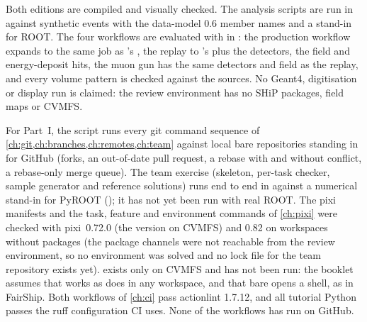 Both editions are compiled and visually checked. The analysis scripts are
run in  against synthetic events with
the data-model 0.6 member names and a stand-in for ROOT. The four workflows
are evaluated with  in : the
production workflow expands to the same job as 's
, the replay to 's
 plus the detectors, the field and
energy-deposit hits, the muon gun has the same detectors and field as the
replay, and every volume pattern is checked against the
 sources. No Geant4, digitisation or display run is claimed:
the review environment has no SHiP packages, field maps or CVMFS.

For Part~I, the script  runs every git
command sequence of \cref{ch:git,ch:branches,ch:remotes,ch:team} against local bare repositories standing
in for GitHub (forks, an out-of-date pull request, a rebase with and without
conflict, a rebase-only merge queue). The team exercise (skeleton, per-task
checker, sample generator and reference solutions) runs end to end in
 against a numerical stand-in for PyROOT
(); it has not yet been run with real ROOT. The pixi manifests and the task,
feature and environment commands of \cref{ch:pixi} were checked with
pixi~0.72.0 (the version on CVMFS) and 0.82 on workspaces without packages (the package channels were not reachable from
the review environment, so no environment was solved and no lock file for the
team repository exists yet).  exists only on CVMFS and has
not been run: the booklet assumes that 
works as  does in any workspace, and that bare 
opens a shell, as in FairShip. Both workflows of \cref{ch:ci} pass actionlint
1.7.12, and all tutorial Python passes the ruff configuration CI uses. None of
the workflows has run on GitHub.

